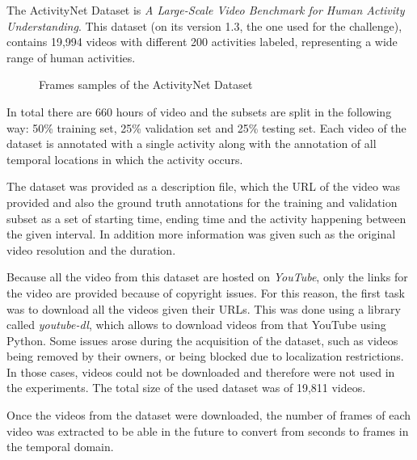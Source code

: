 The ActivityNet Dataset\cite{caba2015activitynet} is \textit{A Large-Scale Video Benchmark for
Human Activity Understanding}. This dataset (on its version 1.3, the one used for the challenge), contains 19,994 videos with different 200 activities labeled, representing a wide range of human activities. 

\begin{figure}[H]
\begin{center}
\end{center}
\caption{Frames samples of the ActivityNet Dataset}
\label{fig:dataset_stats}
\end{figure}

In total there are 660 hours of video and the subsets are split in the following way: 50\% training set, 25\% validation set and 25\% testing set. Each video of the dataset is annotated with a single activity along with the annotation of all temporal locations in which the activity occurs.

The dataset was provided as a description file, which the URL of the video was provided and also the ground truth annotations for the training and validation subset as a set of starting time, ending time and the activity happening between the given interval. In addition more information was given such as the original video resolution and the duration.

Because all the video from this dataset are hosted on \textit{YouTube}, only the links for the video are provided because of copyright issues. For this reason, the first task was to download all the videos given their URLs. This was done using a library called \textit{youtube-dl}, which allows to download videos from that YouTube using Python. Some issues arose during the acquisition of the dataset, such as videos being removed by their owners, or being blocked due to localization restrictions. In those cases, videos could not be downloaded and therefore were not used in the experiments. The total size of the used dataset was of 19,811 videos.


Once the videos from the dataset were downloaded, the number of frames of each video was extracted to be able in the future to convert from seconds to frames in the temporal domain. 

